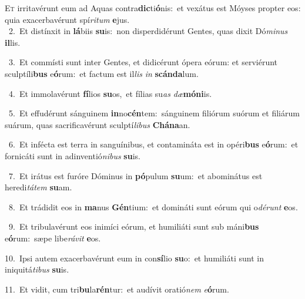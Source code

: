 \lettrine{\initial\textcolor{\initialcolor}{E}}{t} irritavérunt eum ad Aquas contra\-\textbf{dic}\-ti\-\textbf{ó}\-nis:~\star et vexátus est Móyses propter eos: quia exacerbavérunt spí\-\textit{ri}\-\textit{tum} \textbf{e}\-jus.\\
{\numbfont\textcolor{\numbcolor}{~2.}}~Et distínxit in \textbf{lá}\-biis \textbf{su}\-is:~\star non disperdidérunt Gentes, quas dixit Dó\-\textit{mi}\-\textit{nus} \textbf{il}\-lis.\par
{\numbfont\textcolor{\numbcolor}{~3.}}~Et commísti sunt inter Gentes, et didicérunt ópera eórum: et serviérunt sculptíli\textbf{bus} e\-\textbf{ó}\-rum:~\star et factum est il\textit{lis} \textit{in} \textbf{scán}\-\textbf{da}lum.\par
{\numbfont\textcolor{\numbcolor}{~4.}}~Et immolavérunt \textbf{fí}\-lios \textbf{su}\-os,~\star et fílias su\textit{as} \textit{dæ}\-\textbf{mó}\textbf{ni}is.\par
{\numbfont\textcolor{\numbcolor}{~5.}}~Et effudérunt sánguinem \textbf{in}\-no\-\textbf{cén}\-tem:~\star sánguinem filiórum suórum et filiárum suárum, quas sacrificavérunt sculptí\-\textit{li}\-\textit{bus} \textbf{Chá}\-\textbf{na}an.\par
{\numbfont\textcolor{\numbcolor}{~6.}}~Et infécta est terra in sanguínibus, et contamináta est in opéri\textbf{bus} e\-\textbf{ó}\-rum:~\star et fornicáti sunt in adinventió\-\textit{ni}\-\textit{bus} \textbf{su}\-is.\par
{\numbfont\textcolor{\numbcolor}{~7.}}~Et irátus est furóre Dóminus in \textbf{pó}\-pulum \textbf{su}\-um:~\star et abominátus est heredi\-\textit{tá}\-\textit{tem} \textbf{su}\-am.\par
{\numbfont\textcolor{\numbcolor}{~8.}}~Et trádidit eos in \textbf{ma}\-nus \textbf{Gén}\-tium:~\star et domináti sunt eórum qui o\-\textit{dé}\-\textit{runt} \textbf{e}\-os.\par
{\numbfont\textcolor{\numbcolor}{~9.}}~Et tribulavérunt eos inimíci eórum, et humiliáti sunt sub máni\textbf{bus} e\-\textbf{ó}\-rum:~\star sæpe libe\-\textit{rá}\-\textit{vit} \textbf{e}\-os.\par
{\numbfont\textcolor{\numbcolor}{10.}}~Ipsi autem exacerbavérunt eum in con\-\textbf{sí}\-lio \textbf{su}\-o:~\star et humiliáti sunt in iniquitá\-\textit{ti}\-\textit{bus} \textbf{su}\-is.\par
{\numbfont\textcolor{\numbcolor}{11.}}~Et vidit, cum tri\-\textbf{bu}\-la\-\textbf{rén}\-tur:~\star et audívit oratió\textit{nem} \textit{e}\-\textbf{ó}rum.\par
